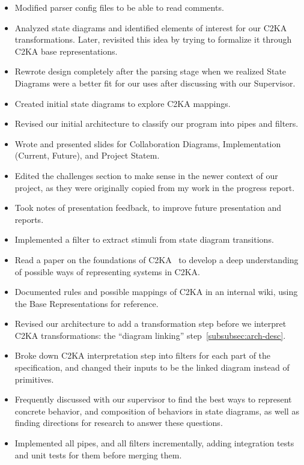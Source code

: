 \begin{itemize}
    \item Modified parser config files to be able to read comments.
    \item Analyzed state diagrams and identified elements of interest for our C2KA transformations.
    Later, revisited this idea by trying to formalize it through C2KA base representations.
    \item Rewrote design completely after the parsing stage when we realized State Diagrams were a better fit for our uses after discussing with our Supervisor.
    \item Created initial state diagrams to explore C2KA mappings.
    \item Revised our initial architecture to classify our program into pipes and filters.
    \item Wrote and presented slides for Collaboration Diagrams, Implementation (Current, Future), and Project Statem.
    \item Edited the challenges section to make sense in the newer context of our project,
    as they were originally copied from my work in the progress report.
    \item Took notes of presentation feedback, to improve future presentation and reports.
    \item Implemented a filter to extract stimuli from state diagram transitions.
    \item Read a paper on the foundations of C2KA~\cite{c2ka_foundations} to develop a deep understanding of possible ways of representing systems in C2KA\@.
    \item Documented rules and possible mappings of C2KA in an internal wiki, using the Base Representations for reference.
    \item Revised our architecture to add a transformation step before we interpret C2KA transformations: the ``diagram linking'' step~\ref{subsubsec:arch-desc}.
    \item Broke down C2KA interpretation step into filters for each part of the specification, and changed their inputs to be the linked diagram instead of primitives.
    \item Frequently discussed with our supervisor to find the best ways to represent concrete behavior,
    and composition of behaviors in state diagrams, as well as finding directions for research to answer these questions.
    \item Implemented all pipes, and all filters incrementally, adding integration tests and unit tests for them before merging them.

\end{itemize}
